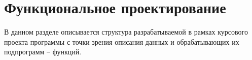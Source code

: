 \section{Функциональное проектирование}
\label{sec:funkproj}


В данном разделе описывается структура разрабатываемой в рамках
курсового проекта программы с точки зрения описания данных и
обрабатывающих их подпрограмм -- функций.




